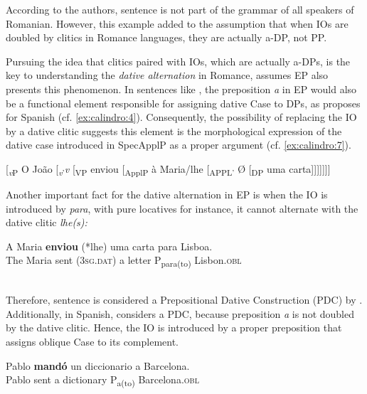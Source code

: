 \documentclass[output=paper,colorlinks,citecolor=brown,nonflat]{./langscibook}
\begin{document}
According to the authors, sentence  is not part of the grammar of all speakers of Romanian. However, this example added to the assumption that when IOs are doubled by clitics in Romance languages, they are actually a-DP, not PP. 

Pursuing the idea that clitics paired with IOs, which are actually a-DPs, is the key to understanding the \textit{dative alternation} in Romance, \citet{TorresMorais2007} assumes EP also presents this phenomenon. In sentences like , the preposition \textit{a} in EP would also be a functional element responsible for assigning dative Case to DPs, as \citet{Cuervo2003} proposes for Spanish (cf. \ref{ex:calindro:4}). Consequently, the possibility of replacing the IO by a dative clitic suggests this element is the morphological expression of the dative case introduced in SpecApplP as a proper argument (cf. \ref{ex:calindro:7}). 

\ea%
    \label{ex:calindro:7}{}
    [\textit{\textsubscript{v}}\textsubscript{P} O João [\textit{\textsubscript{v}}\textsubscript{’}\textit{v} [\textsubscript{VP} enviou [\textsubscript{ApplP} à Maria/lhe [\textsubscript{APPL’} Ø [\textsubscript{DP} uma carta]]]]]]] \hfill \citep[175]{TorresMorais2007}
    \z

Another important fact for the dative alternation in EP is when the IO is introduced by \textit{para}, with pure locatives for instance, it cannot alternate with the dative clitic \textit{lhe(s):}

\ea%
    \label{ex:calindro:8}
    \gll A Maria     \textbf{enviou} (*lhe)      uma carta  {para} {Lisboa}.\\
    The Maria sent (\textsc{3sg.dat})  a letter      P{\textsubscript{para(to)}} Lisbon.\textsc{obl}\\
    \glt ~\hfill \citep[96]{TorresMorais2007}
    \z

Therefore, sentence  is considered a Prepositional Dative Construction (PDC) by \citet{TorresMorais2007}. Additionally, in Spanish, \citet{Cuervo2003} considers  a PDC, because preposition \textit{a} is not doubled by the dative clitic. Hence, the IO is introduced by a proper preposition that assigns oblique Case to its complement.

\ea%
    \label{ex:calindro:9}
    \gll Pablo \textbf{mandó} un diccionario  {a} {Barcelona}.\\
    Pablo  sent      a dictionary     P\textsubscript{{a(to)}} Barcelona.\textsc{obl}\\
    \glt ~\hfill \citep[36]{Cuervo2003}
    \z
\end{document}
